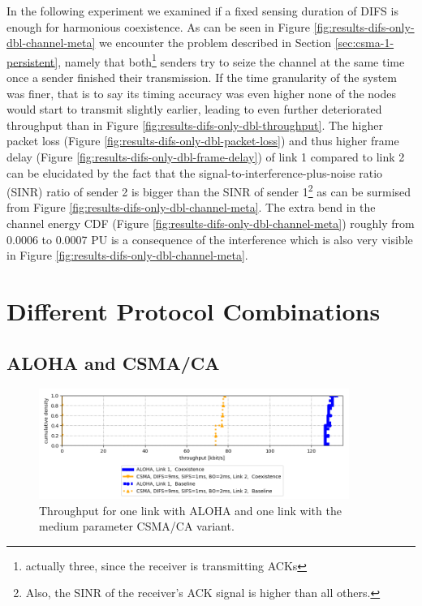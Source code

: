 In the following experiment we examined if a fixed sensing duration of DIFS is enough for harmonious coexistence. As can be seen in Figure \ref{fig:results-difs-only-dbl-channel-meta} we encounter the problem described in Section \ref{sec:csma-1-persistent}, namely that both\footnote{actually three, since the receiver is transmitting ACKs} senders try to seize the channel at the same time once a sender finished their transmission. If the time granularity of the system was finer, that is to say its timing accuracy was even higher none of the nodes would start to transmit slightly earlier, leading to even further deteriorated throughput than in Figure \ref{fig:results-difs-only-dbl-throughput}. The higher packet loss (Figure \ref{fig:results-difs-only-dbl-packet-loss}) and thus higher frame delay (Figure \ref{fig:results-difs-only-dbl-frame-delay}) of link 1 compared to link 2  can be elucidated by the fact that the signal-to-interference-plus-noise ratio (SINR) ratio of sender 2 is bigger than the SINR of sender 1\footnote{Also, the SINR of the receiver's ACK signal is higher than all others.} as can be surmised from Figure \ref{fig:results-difs-only-dbl-channel-meta}. The extra bend in the channel energy CDF (Figure \ref{fig:results-difs-only-dbl-channel-meta}) roughly from 0.0006 to 0.0007 PU is a consequence of the interference which is also very visible in Figure \ref{fig:results-difs-only-dbl-channel-meta}.

\section{Different Protocol Combinations}
\label{sec:different-protocols}

\subsection{ALOHA and CSMA/CA}
\label{sec:aloha-csma}

\begin{figure}[tb]
	\label{fig:results-aloha-csma-throughput}
	\begin{center}
		\includegraphics[width=0.9\textwidth]{pictures/results/different_combinations/aloha_csma/throughput_cdf}
	\end{center}
	\caption{Throughput for one link with ALOHA and one link with the medium parameter CSMA/CA variant.}
\end{figure}

